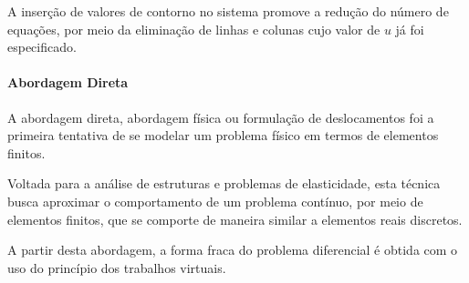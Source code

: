 A inserção de valores de contorno no sistema promove a redução do número de equações, por meio da eliminação de linhas e colunas cujo valor de $u$ já foi especificado.

\paragraph{Abordagem Direta}

A abordagem direta, abordagem física ou formulação de deslocamentos foi a primeira tentativa de se modelar um problema físico em termos de elementos finitos.

Voltada para a análise de estruturas e problemas de elasticidade, esta técnica busca aproximar o comportamento de um problema contínuo, por meio de elementos finitos, que se comporte de maneira similar a elementos reais discretos.
\citep[p. 19]{zien}

A partir desta abordagem, a forma fraca do problema diferencial é obtida com o uso do princípio dos trabalhos virtuais.
\citep[p. 20]{zien}

 

